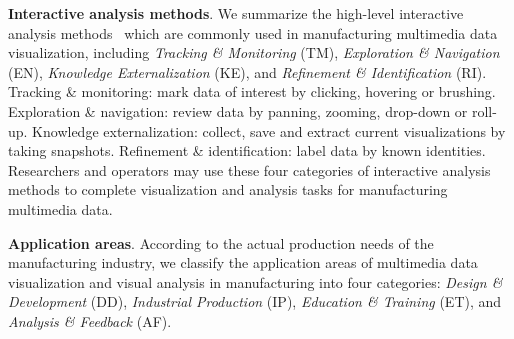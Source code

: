 \documentclass[a4paper,fleqn]{cas-dc}
\begin{document}
\textbf{Interactive analysis methods}. 
We summarize the high-level interactive analysis methods~\cite{yi2007toward} which are commonly used in manufacturing multimedia data visualization, including \textit{Tracking \& Monitoring} (TM), \textit{Exploration \& Navigation} (EN), \textit{Knowledge Externalization} (KE), and \textit{Refinement \& Identification} (RI).
Tracking \& monitoring: mark data of interest by clicking, hovering or brushing.
Exploration \& navigation: review data by panning, zooming, drop-down or roll-up.
Knowledge externalization: collect, save and extract current visualizations by taking snapshots.
Refinement \& identification: label data by known identities.
Researchers and operators may use these four categories of interactive analysis methods to complete visualization and analysis tasks for manufacturing multimedia data.

\textbf{Application areas}. 
According to the actual production needs of the manufacturing industry, we classify the application areas of multimedia data visualization and visual analysis in manufacturing into four categories: \textit{Design \& Development} (DD), \textit{Industrial Production} (IP), \textit{Education \& Training} (ET), and \textit{Analysis \& Feedback} (AF).

\end{document}
